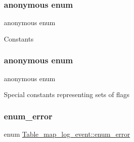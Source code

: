 \subsubsection{\texorpdfstring{anonymous enum}{anonymous enum}}
{\footnotesize\ttfamily anonymous enum}

Constants \mbox{\label{classTable__map__log__event_aafdc2bd04a3952c3f050ca626789b7a1}} 
\subsubsection{\texorpdfstring{anonymous enum}{anonymous enum}}
{\footnotesize\ttfamily anonymous enum}

Special constants representing sets of flags \mbox{\label{classTable__map__log__event_ae8795bd269eafd91a88c631e2ec1e6f0}} 
\subsubsection{\texorpdfstring{enum\+\_\+error}{enum\_error}}
{\footnotesize\ttfamily enum \mbox{\hyperlink{classTable__map__log__event_ae8795bd269eafd91a88c631e2ec1e6f0}{Table\+\_\+map\+\_\+log\+\_\+event\+::enum\+\_\+error}}}

